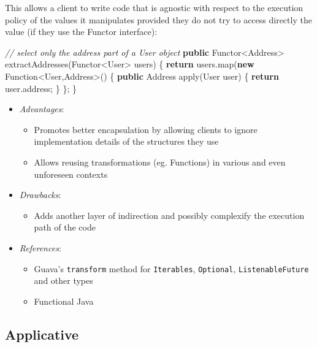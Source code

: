 \documentclass[11pt,]{article}
\newenvironment{Shaded}{}{}
\newcommand{\KeywordTok}[1]{\textcolor[rgb]{0.00,0.44,0.13}{\textbf{{#1}}}}
\newcommand{\CommentTok}[1]{\textcolor[rgb]{0.38,0.63,0.69}{\textit{{#1}}}}
\newcommand{\FunctionTok}[1]{\textcolor[rgb]{0.02,0.16,0.49}{{#1}}}
\newcommand{\NormalTok}[1]{{#1}}
\begin{document}
This allows a client to write code that is agnostic with respect to the
execution policy of the values it manipulates provided they do not try
to access directly the value (if they use the Functor interface):

\begin{Shaded}
\begin{Highlighting}[]
\CommentTok{// select only the address part of a User object}
\KeywordTok{public} \NormalTok{Functor<Address>  }\FunctionTok{extractAddresses}\NormalTok{(Functor<User> users) \{}
  \KeywordTok{return} \NormalTok{users.}\FunctionTok{map}\NormalTok{(}\KeywordTok{new} \NormalTok{Function<User,Address>() \{}
    \KeywordTok{public} \NormalTok{Address }\FunctionTok{apply}\NormalTok{(User user) \{}
      \KeywordTok{return} \NormalTok{user.}\FunctionTok{address}\NormalTok{;}
    \NormalTok{\}}
  \NormalTok{\};}
\NormalTok{\}}
\end{Highlighting}
\end{Shaded}

\begin{itemize}
\item
  \emph{Advantages}:

  \begin{itemize}
  \item
    Promotes better encapsulation by allowing clients to ignore
    implementation details of the structures they use
  \item
    Allows reusing transformations (eg. Functions) in various and even
    unforeseen contexts
  \end{itemize}
\item
  \emph{Drawbacks}:

  \begin{itemize}
  \item
    Adds another layer of indirection and possibly complexify the
    execution path of the code
  \end{itemize}
\item
  \emph{References}:

  \begin{itemize}
  \item
    Guava's \texttt{transform} method for \texttt{Iterables},
    \texttt{Optional}, \texttt{ListenableFuture} and other types
  \item
    Functional Java
  \end{itemize}
\end{itemize}

\subsection{Applicative}
\end{document}
